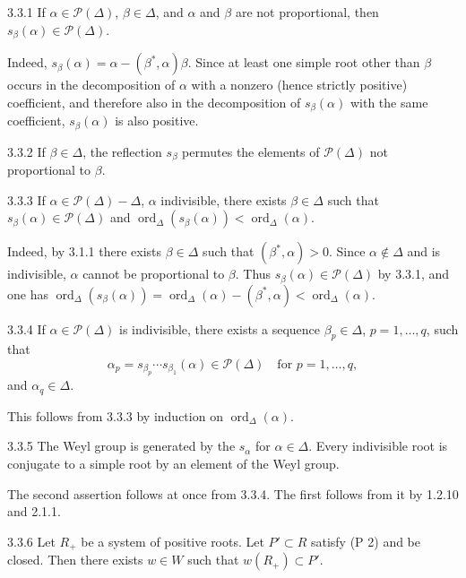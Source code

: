 \begin{lemma}{3.3.1}\label{XXI.3.3.1}
If $\alpha\in\mathcal P(\Delta)$, $\beta\in\Delta$, and $\alpha$ and $\beta$ are not proportional, then $s_\beta(\alpha)\in\mathcal P(\Delta)$.
\end{lemma}
Indeed, $s_\beta(\alpha)=\alpha-(\beta^*,\alpha)\beta$. Since at least one simple root other than $\beta$ occurs in the decomposition of $\alpha$ with a nonzero (hence strictly positive) coefficient, and therefore also in the decomposition of $s_\beta(\alpha)$ with the same coefficient, $s_\beta(\alpha)$ is also positive.
\begin{corollary}{3.3.2}\label{XXI.3.3.2}
If $\beta\in\Delta$, the reflection $s_\beta$ permutes the elements of $\mathcal P(\Delta)$ not proportional to $\beta$.
\end{corollary}
\begin{lemma}{3.3.3}\label{XXI.3.3.3}
If $\alpha\in\mathcal P(\Delta)-\Delta$, $\alpha$ indivisible, there exists $\beta\in\Delta$ such that $s_\beta(\alpha)\in\mathcal P(\Delta)$ and $\operatorname{ord}_\Delta(s_\beta(\alpha))<\operatorname{ord}_\Delta(\alpha)$.
\end{lemma}
Indeed, by 3.1.1 there exists $\beta\in\Delta$ such that $(\beta^*,\alpha)>0$. Since $\alpha\notin\Delta$ and is indivisible, $\alpha$ cannot be proportional to $\beta$. Thus $s_\beta(\alpha)\in\mathcal P(\Delta)$ by 3.3.1, and one has $\operatorname{ord}_\Delta(s_\beta(\alpha))=\operatorname{ord}_\Delta(\alpha)-(\beta^*,\alpha)<\operatorname{ord}_\Delta(\alpha)$.
\begin{corollary}{3.3.4}\label{XXI.3.3.4}
If $\alpha\in\mathcal P(\Delta)$ is indivisible, there exists a sequence $\beta_p\in\Delta$, $p=1,\ldots,q$, such that
\[
\alpha_p=s_{\beta_p}\cdots s_{\beta_1}(\alpha)\in\mathcal P(\Delta)\quad\text{for }p=1,\ldots,q,
\]
and $\alpha_q\in\Delta$.
\end{corollary}
This follows from 3.3.3 by induction on $\operatorname{ord}_\Delta(\alpha)$.
\begin{proposition}{3.3.5}\label{XXI.3.3.5}
The Weyl group is generated by the $s_\alpha$ for $\alpha\in\Delta$. Every indivisible root is conjugate to a simple root by an element of the Weyl group.
\end{proposition}
The second assertion follows at once from 3.3.4. The first follows from it by 1.2.10 and 2.1.1.
\begin{proposition}{3.3.6}\label{XXI.3.3.6}
Let $R_+$ be a system of positive roots. Let $P'\subset R$ satisfy (P 2) and be closed. Then there exists $w\in W$ such that $w(R_+)\subset P'$.
\end{proposition}
